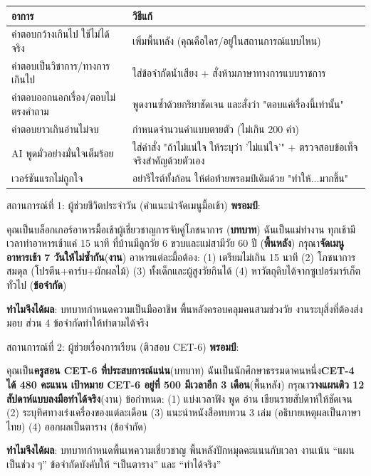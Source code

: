 
\begin{center}
\begin{tabularx}{\linewidth}{|X|X|}
\hline
\textbf{อาการ} & \textbf{วิธีแก้} \tabularnewline
\hline
คำตอบกว้างเกินไป ใช้ไม่ได้จริง & เพิ่มพื้นหลัง (คุณคือใคร/อยู่ในสถานการณ์แบบไหน) \tabularnewline
คำตอบเป็นวิชาการ/ทางการเกินไป & ใส่ข้อจำกัดน้ำเสียง + สั่งห้ามภาษาทางการแบบราชการ \tabularnewline
คำตอบออกนอกเรื่อง/ตอบไม่ตรงคำถาม & พูดงานซ้ำด้วยกริยาชัดเจน และสั่งว่า "ตอบแค่เรื่องนี้เท่านั้น" \tabularnewline
คำตอบยาวเกินอ่านไม่จบ & กำหนดจำนวนคำแบบตายตัว (ไม่เกิน 200 คำ) \tabularnewline
AI พูดมั่วอย่างมั่นใจเต็มร้อย & ใส่คำสั่ง "ถ้าไม่แน่ใจ ให้ระบุว่า 'ไม่แน่ใจ'" + ตรวจสอบข้อเท็จจริงสำคัญด้วยตัวเอง \tabularnewline
เวอร์ชันแรกไม่ถูกใจ & อย่ารีไรต์ทั้งก้อน ให้ต่อท้ายพรอมป์เดิมด้วย "ทำให้...มากขึ้น" \tabularnewline
\hline
\end{tabularx}
\end{center}


\begin{tcbinfo}{สถานการณ์ที่ 1: ผู้ช่วยชีวิตประจำวัน (คำแนะนำจัดเมนูมื้อเช้า)}
\textbf{พรอมป์}:

คุณเป็นบล็อกเกอร์อาหารมื้อเช้าผู้เชี่ยวชาญการจับคู่โภชนาการ (\textbf{บทบาท}) ฉันเป็นแม่ทำงาน ทุกเช้ามีเวลาทำอาหารเช้าแค่ 15 นาที ที่บ้านมีลูกวัย 6 ขวบและแม่สามีวัย 60 ปี (\textbf{พื้นหลัง}) กรุณา\textbf{จัดเมนูอาหารเช้า 7 วันให้ไม่ซ้ำกัน}(\textbf{งาน}) อาหารแต่ละมื้อต้อง: (1) เตรียมไม่เกิน 15 นาที (2) โภชนาการสมดุล (โปรตีน+คาร์บ+ผักผลไม้) (3) ทั้งเด็กและผู้สูงวัยกินได้ (4) หาวัตถุดิบได้จากซูเปอร์มาร์เก็ตทั่วไป (\textbf{ข้อจำกัด})

\textbf{ทำไมจึงได้ผล}: บทบาทกำหนดความเป็นมืออาชีพ พื้นหลังครอบคลุมคนสามช่วงวัย งานระบุสิ่งที่ต้องส่งมอบ ส่วน 4 ข้อจำกัดทำให้ทำตามได้จริง

\end{tcbinfo}

\begin{tcbinfo}{สถานการณ์ที่ 2: ผู้ช่วยเรื่องการเรียน (ติวสอบ CET-6)}
\textbf{พรอมป์}:

คุณเป็น\textbf{ครูสอน CET-6 ที่ประสบการณ์แน่น}(บทบาท) ฉันเป็นนักศึกษาธรรมดาคนหนึ่ง\textbf{CET-4 ได้ 480 คะแนน เป้าหมาย CET-6 อยู่ที่ 500 มีเวลาอีก 3 เดือน}(พื้นหลัง) กรุณา\textbf{วางแผนติว 12 สัปดาห์แบบลงมือทำได้จริง}(งาน) ข้อกำหนด: (1) แบ่งเวลาฟัง พูด อ่าน เขียนรายสัปดาห์ให้ชัดเจน (2) ระบุทิศทางเร่งเครื่องของแต่ละเดือน (3) แนะนำหนังสือทบทวน 3 เล่ม (อธิบายเหตุผลเป็นภาษาไทย) (4) ออกผลเป็นตาราง (ข้อจำกัด)

\textbf{ทำไมจึงได้ผล}: บทบาทกำหนดพื้นเพความเชี่ยวชาญ พื้นหลังปักหมุดคะแนนกับเวลา งานเน้น “แผนเป็นช่วง ๆ” ข้อจำกัดบังคับให้ “เป็นตาราง” และ “ทำได้จริง”

\end{tcbinfo}

